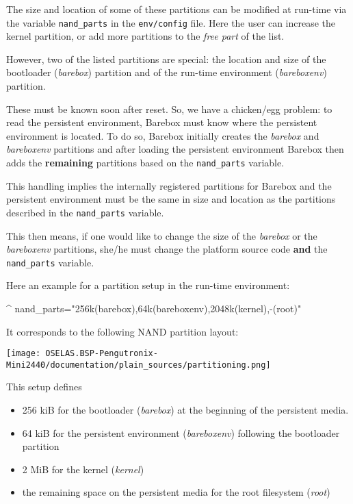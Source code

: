 The size and location of some of these partitions can be modified at run-time
via the variable \texttt{nand\_parts} in the \texttt{env/config} file. Here the
user can increase the kernel partition, or add more partitions to the
\textit{free part} of the list.

However, two of the listed partitions are special: the location and size of
the bootloader (\textit{barebox}) partition and of the run-time environment
(\textit{bareboxenv}) partition.
%
%
%

These must be known soon after reset. So, we have a chicken/egg problem: to
read the persistent environment, Barebox must know where the persistent environment
is located. To do so, Barebox initially creates the \textit{barebox} and
\textit{bareboxenv} partitions and after loading the persistent environment
Barebox then adds the \textbf{remaining} partitions based on the
\texttt{nand\_parts} variable.

This handling implies the internally registered partitions for Barebox and the
persistent environment must be the same in size and location as the partitions
described in the \texttt{nand\_parts} variable.

This then means, if one would like to change the size of the \textit{barebox}
or the \textit{bareboxenv} partitions, she/he must change the platform source
code \textbf{and} the \texttt{nand\_parts} variable.

Here an example for a partition setup in the run-time environment:

\begin{ptxshell}[escapechar=|]{^}
nand_parts="256k(barebox),64k(bareboxenv),2048k(kernel),-(root)"
\end{ptxshell}

It corresponds to the following NAND partition layout:

\centerline{\texttt{[image: OSELAS.BSP-Pengutronix-Mini2440/documentation/plain\_sources/partitioning.png]}}

This setup defines

\begin{itemize}
 \item 256 kiB for the bootloader (\textit{barebox}) at the beginning of the
  persistent media.
 \item 64 kiB for the persistent environment (\textit{bareboxenv}) following
  the bootloader partition
 \item 2 MiB for the kernel (\textit{kernel})
 \item the remaining space on the persistent media for the root filesystem
  (\textit{root})
\end{itemize}

